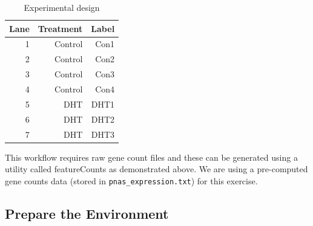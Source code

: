 \begin{table}[H]
  \centering
  \caption{Experimental design}
    \begin{tabular}{rrr}
    \toprule
    \textbf{Lane} & \textbf{Treatment} & \textbf{Label} \\
    \midrule
    1    & Control & Con1 \\
    2    & Control & Con2 \\
    3    & Control & Con3 \\
    4    & Control & Con4 \\
    5    & DHT & DHT1 \\
    6    & DHT & DHT2 \\
    7    & DHT & DHT3 \\

    \bottomrule
    \end{tabular}
  \label{tab:experimental_design}
\end{table}

\begin{note}
This workflow requires raw gene count files and these can be generated using a utility called featureCounts as demonstrated above. We are using a pre-computed gene counts data (stored in \texttt{pnas\_expression.txt}) for this exercise.
\end{note}

\subsection{Prepare the Environment}

